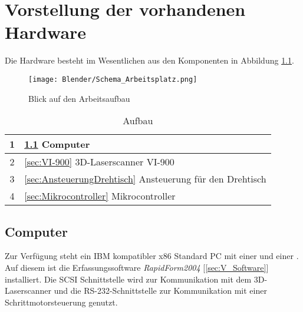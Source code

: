 \chapter{Vorstellung der vorhandenen Hardware}
\label{sec:Hardware}
Die Hardware besteht im Wesentlichen aus den Komponenten in Abbildung \ref{fig:Übersicht}.
\begin{figure}[htb]
\centering
\texttt{[image: Blender/Schema\_Arbeitsplatz.png]}
\caption{Blick auf den Arbeitsaufbau}
\label{fig:Übersicht}
\end{figure}
\begin{table}[htb]
\begin{tabular}{|c|l|}	\hline 
\rule[-1ex]{0pt}{2.5ex} 1 & 
\ref{sec:Computer} Computer\\ \hline 
\rule[-1ex]{0pt}{2.5ex} 2 & 
\ref{sec:VI-900} 3D-Laserscanner VI-900\\ \hline 
\rule[-1ex]{0pt}{2.5ex} 3 & 
\ref{sec:AnsteuerungDrehtisch} Ansteuerung für den Drehtisch\\ \hline 
\rule[-1ex]{0pt}{2.5ex} 4 & 
\ref{sec:Mikrocontroller} Mikrocontroller\\ \hline 
\end{tabular} 
\caption{Aufbau}
\label{tbl:Aufbau}
\end{table}
\section{Computer}
\label{sec:Computer}
Zur Verfügung steht ein IBM kompatibler x86 Standard PC mit einer  und einer . Auf diesem ist die Erfassungssoftware \emph{RapidForm2004} [\ref{sec:V_Software}] installiert. Die SCSI Schnittstelle wird zur Kommunikation mit dem 3D-Laserscanner und die RS-232-Schnittstelle zur Kommunikation mit einer Schrittmotorsteuerung genutzt.
